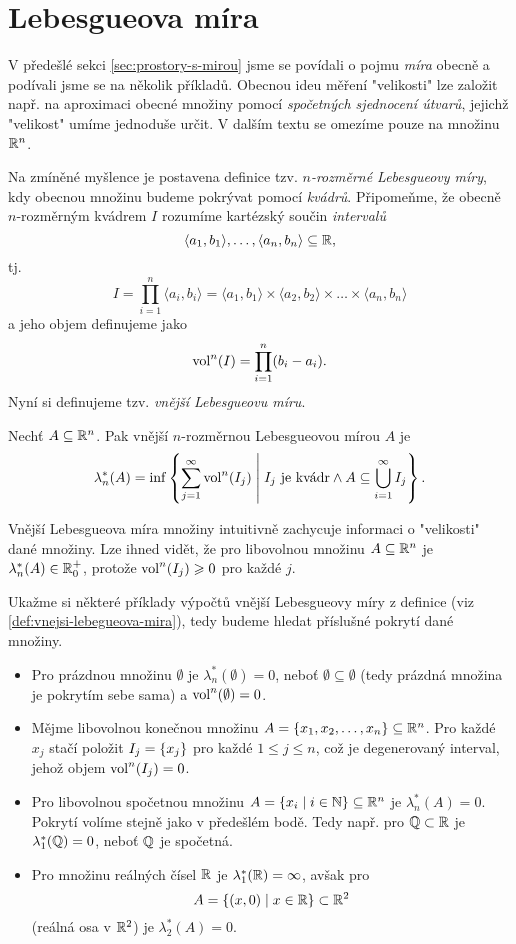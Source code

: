 \section{Lebesgueova míra}\label{sec:lebesgueova-mira}


V předešlé sekci \ref{sec:prostory-s-mirou} jsme se povídali o pojmu \emph{míra} obecně a podívali jsme se na několik příkladů. Obecnou ideu měření "velikosti" lze založit např. na aproximaci obecné množiny pomocí \emph{spočetných sjednocení útvarů}, jejichž "velikost" umíme jednoduše určit. V dalším textu se omezíme pouze na množinu $\mathbb{R}^n$.

Na zmíněné myšlence je postavena definice tzv. \emph{$n$-rozměrné Lebesgueovy míry}, kdy obecnou množinu budeme pokrývat pomocí \emph{kvádrů}. Připomeňme, že obecně \mbox{$n$-rozměrným} kvádrem $I$ rozumíme kartézský součin \emph{intervalů}
\[\langle a_1,b_1\rangle,\ldots,\langle a_n,b_n\rangle\subseteq\mathbb{R},\]
tj.
\[I=\prod_{i=1}^{n}\langle a_i,b_i\rangle=\langle a_1,b_1\rangle\times\langle a_2,b_2\rangle\times\dots\times\langle a_n,b_n\rangle\]
a jeho objem definujeme jako
\[\operatorname{vol}^n(I)=\prod_{i=1}^{n}(b_i-a_i).\]
Nyní si definujeme tzv. \emph{vnější Lebesgueovu míru}.
\begin{definition}\label{def:vnejsi-lebegueova-mira}
    Nechť $A\subseteq\mathbb{R}^n$. Pak vnější $n$-rozměr\-nou Lebesgueovou mírou $A$ je
    \[\lambda_n^*(A)=\inf\left\{\sum_{j=1}^{\infty}\operatorname{vol}^n(I_j)\;\middle|\;\text{$I_j$ je kvádr}\land A\subseteq\bigcup_{i=1}^\infty I_j\right\}.\]
\end{definition}
Vnější Lebesgueova míra množiny intuitivně zachycuje informaci o "velikosti" dané množiny.  Lze ihned vidět, že pro libovolnou množinu $A\subseteq\mathbb{R}^n$ je $\lambda_n^*(A)\in\mathbb{R}_0^+$, protože $\operatorname{vol}^n(I_j)\geqslant0$ pro každé $j$.
\begin{example}
    Ukažme si některé příklady výpočtů vnější Lebesgueovy míry z definice (viz \ref{def:vnejsi-lebegueova-mira}), tedy budeme hledat příslušné pokrytí dané množiny.
    \begin{itemize}
        \item Pro prázdnou množinu $\emptyset$ je $\lambda_n^*(\emptyset)=0$, neboť $\emptyset\subseteq\emptyset$ (tedy prázdná množina je pokrytím sebe sama) a $\operatorname{vol}^n(\emptyset)=0$.
        \item Mějme libovolnou konečnou množinu $A=\left\{x_1,x_2,\dots,x_n\right\}\subseteq\mathbb{R}^n$. Pro každé $x_j$ stačí položit $I_j=\left\{x_j\right\}$ pro každé $1\leqslant j\leqslant n$, což je degenerovaný interval, jehož objem $\operatorname{vol}^n(I_j)=0$.
        \item Pro libovolnou spočetnou množinu $A=\left\{x_i\mid i\in\mathbb{N}\right\}\subseteq\mathbb{R}^n$ je $\lambda_n^*(A)=0$. Pokrytí volíme stejně jako v předešlém bodě. Tedy např. pro $\mathbb{Q}\subset\mathbb{R}$ je $\lambda_1^*(\mathbb{Q})=0$, neboť $\mathbb{Q}$ je spočetná.
        \item Pro množinu reálných čísel $\mathbb{R}$ je $\lambda_1^*(\mathbb{R})=\infty$, avšak pro 
        \[A=\left\{(x,0)\mid x\in\mathbb{R}\right\}\subset\mathbb{R}^2\]
        (reálná osa v $\mathbb{R}^2$) je $\lambda_2^*(A)=0$.
    \end{itemize}
\end{example}
